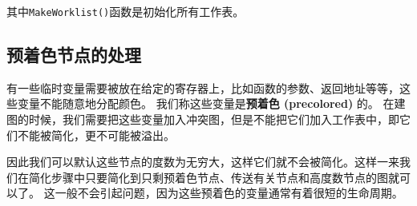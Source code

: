 其中\texttt{MakeWorklist()}函数是初始化所有工作表。

\subsection{预着色节点的处理}

有一些临时变量需要被放在给定的寄存器上，比如函数的参数、返回地址等等，这些变量不能随意地分配颜色。
我们称这些变量是\textbf{预着色 (precolored)} 的。
在建图的时候，我们需要把这些变量加入冲突图，但是不能把它们加入工作表中，即它们不能被简化，更不可能被溢出。

因此我们可以默认这些节点的度数为无穷大，这样它们就不会被简化。这样一来我们在简化步骤中只要简化到只剩预着色节点、传送有关节点和高度数节点的图就可以了。
这一般不会引起问题，因为这些预着色的变量通常有着很短的生命周期。
